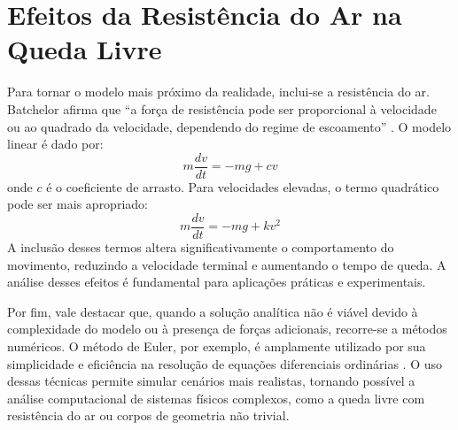 \section{Efeitos da Resistência do Ar na Queda Livre}

Para tornar o modelo mais próximo da realidade, inclui-se a resistência do ar. Batchelor afirma que “a força de resistência pode ser proporcional à velocidade ou ao quadrado da velocidade, dependendo do regime de escoamento” \cite[p.~246]{batchelor2000}. O modelo linear é dado por:
\begin{equation}
	m \frac{dv}{dt} = -mg + c v
\end{equation}
onde $c$ é o coeficiente de arrasto. Para velocidades elevadas, o termo quadrático pode ser mais apropriado:
\begin{equation}
	m \frac{dv}{dt} = -mg + k v^2
\end{equation}
A inclusão desses termos altera significativamente o comportamento do movimento, reduzindo a velocidade terminal e aumentando o tempo de queda. A análise desses efeitos é fundamental para aplicações práticas e experimentais.


Por fim, vale destacar que, quando a solução analítica não é viável devido à complexidade do modelo ou à presença de forças adicionais, recorre-se a métodos numéricos. O método de Euler, por exemplo, é amplamente utilizado por sua simplicidade e eficiência na resolução de equações diferenciais ordinárias \cite[p.~7]{butcher2016}. O uso dessas técnicas permite simular cenários mais realistas, tornando possível a análise computacional de sistemas físicos complexos, como a queda livre com resistência do ar ou corpos de geometria não trivial.
